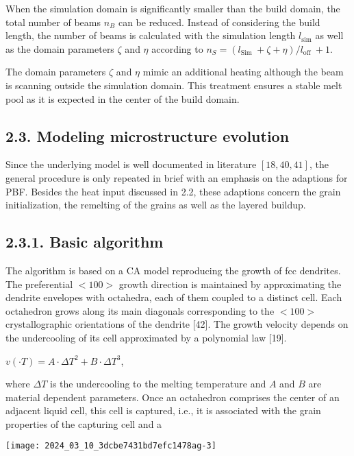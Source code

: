 \documentclass[10pt]{article}
\begin{document}
When the simulation domain is significantly smaller than the build domain, the total number of beams $n_{B}$ can be reduced. Instead of considering the build length, the number of beams is calculated with the simulation length $l_{\operatorname{sim}}$ as well as the domain parameters $\zeta$ and $\eta$ according to $n_{S}=\left(l_{\text {Sim }}+\zeta+\eta\right) / l_{\text {off }}+1$.

The domain parameters $\zeta$ and $\eta$ mimic an additional heating although the beam is scanning outside the simulation domain. This treatment ensures a stable melt pool as it is expected in the center of the build domain.

\subsection*{2.3. Modeling microstructure evolution}
Since the underlying model is well documented in literature $[18,40,41]$, the general procedure is only repeated in brief with an emphasis on the adaptions for PBF. Besides the heat input discussed in 2.2, these adaptions concern the grain initialization, the remelting of the grains as well as the layered buildup.

\subsection*{2.3.1. Basic algorithm}
The algorithm is based on a CA model reproducing the growth of fcc dendrites. The preferential $<100>$ growth direction is maintained by approximating the dendrite envelopes with octahedra, each of them coupled to a distinct cell. Each octahedron grows along its main diagonals corresponding to the $<100>$ crystallographic orientations of the dendrite [42]. The growth velocity depends on the undercooling of its cell approximated by a polynomial law [19].

$v(\cdot T)=A \cdot \Delta T^{2}+B \cdot \Delta T^{3}$,

where $\Delta T$ is the undercooling to the melting temperature and $A$ and $B$ are material dependent parameters. Once an octahedron comprises the center of an adjacent liquid cell, this cell is captured, i.e., it is associated with the grain properties of the capturing cell and a

\begin{center}
\texttt{[image: 2024\_03\_10\_3dcbe7431bd7efc1478ag-3]}
\end{center}
\end{document}
